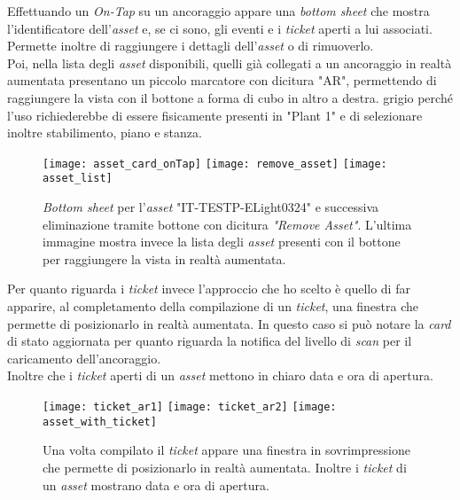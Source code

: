Effettuando un \textit{On-Tap} su un ancoraggio appare una \textit{bottom sheet} che mostra l'identificatore dell'\textit{asset} e, se ci sono, gli eventi e i \textit{ticket} aperti a lui associati. Permette inoltre di raggiungere i dettagli dell'\textit{asset} o di rimuoverlo.\\
Poi, nella lista degli \textit{asset} disponibili, quelli già collegati a un ancoraggio in realtà aumentata presentano un piccolo marcatore con dicitura "AR", permettendo di raggiungere la vista con il bottone a forma di cubo in altro a destra. \e{} grigio perché l'uso richiederebbe di essere fisicamente presenti in "Plant 1" e di selezionare inoltre stabilimento, piano e stanza.

\begin{figure}[H]
  \centering
  \texttt{[image: asset\_card\_onTap]}\hfill
  \texttt{[image: remove\_asset]}\hfill
  \texttt{[image: asset\_list]}
  \caption[\textit{Bottom sheet asset} per eliminazione e lista \textit{asset}]{\textit{Bottom sheet} per l'\textit{asset} "IT-TESTP-ELight0324" e successiva eliminazione tramite bottone con dicitura \textit{"Remove Asset"}. L'ultima immagine mostra invece la lista degli \textit{asset} presenti con il bottone per raggiungere la vista in realtà aumentata.}
  \label{fig:asset_list}
\end{figure}

Per quanto riguarda i \textit{ticket} invece l'approccio che ho scelto è quello di far apparire, al completamento della compilazione di un \textit{ticket}, una finestra che permette di posizionarlo in realtà aumentata. In questo caso si può notare la \textit{card} di stato aggiornata per quanto riguarda la notifica del livello di \textit{scan} per il caricamento dell'ancoraggio.\\
Inoltre che i \textit{ticket} aperti di un \textit{asset} mettono in chiaro data e ora di apertura.

\begin{figure}[H]
  \centering
  \texttt{[image: ticket\_ar1]}\hfill
  \texttt{[image: ticket\_ar2]}\hfill
  \texttt{[image: asset\_with\_ticket]}
  \caption[Caricamento \textit{ticket} realtà aumentata e \textit{ticket} su \textit{asset}]{Una volta compilato il \textit{ticket} appare una finestra in sovrimpressione che permette di posizionarlo in realtà aumentata. Inoltre i \textit{ticket} di un \textit{asset} mostrano data e ora di apertura.}
  \label{fig:ticket_ar}
\end{figure}


